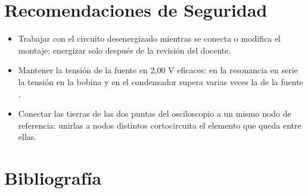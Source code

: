 \documentclass[12pt]{article}
\begin{document}
\section{Recomendaciones de Seguridad}\label{sec:seguridad}
\begin{itemize}
  \item Trabajar con el circuito desenergizado mientras se conecta o modifica el montaje; energizar solo después de la revisión del docente.
  \item Mantener la tensión de la fuente en 2,00 V eficaces: en la resonancia en serie la tensión en la bobina y en el condensador supera varias veces la de la fuente \cite{ref1}.
  \item Conectar las tierras de las dos puntas del osciloscopio a un mismo nodo de referencia: unirlas a nodos distintos cortocircuita el elemento que queda entre ellas.
\end{itemize}

\section{Bibliografía}\label{sec:bibliografia}
\nocite{*}
\bibliografia
\end{document}
